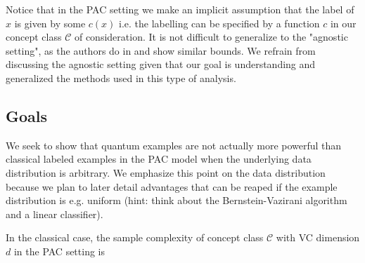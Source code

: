 \documentclass[main.tex]{subfiles}
\begin{document}
Notice that in the PAC setting we make an implicit assumption that the label of $x$ is given by some $c(x)$ i.e. the labelling can be specified by a function $c$ in our concept class $\mathcal{C}$ of consideration. It is not difficult to generalize to the "agnostic setting", as the authors do in \cite{arunachalam2016optimal} and show similar bounds. We refrain from discussing the agnostic setting given that our goal is understanding and generalized the methods used in this type of analysis.
%
%
%
%
%
%
%
\subsection{Goals}

We seek to show that quantum examples are not actually more powerful than classical labeled examples in the PAC model when the underlying data distribution is arbitrary. We emphasize this point on the data distribution because we plan to later detail advantages that can be reaped if the example distribution is e.g. uniform (hint: think about the Bernstein-Vazirani algorithm and a linear classifier).

In the classical case, the sample complexity of concept class $\mathcal{C}$ with VC dimension $d$ in the PAC setting is
\end{document}
